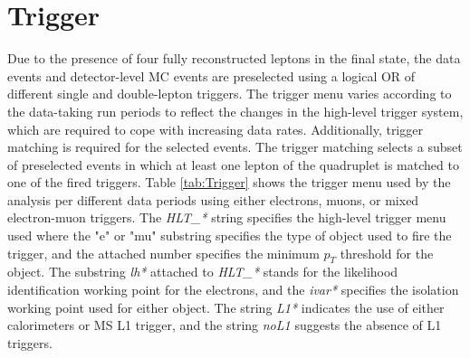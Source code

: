 \section{Trigger}
\label{sec:Trigger}

Due to the presence of four fully reconstructed leptons in the final state, the data events and detector-level MC events are preselected using a logical OR of different single and double-lepton triggers. The trigger menu varies according to the data-taking run periods to reflect the changes in the high-level trigger system, which are required to cope with increasing data rates. Additionally, trigger matching is required for the selected events. The trigger matching selects a subset of preselected events in which at least one lepton of the quadruplet is matched to one of the fired triggers. Table \ref{tab:Trigger} shows the trigger menu used by the analysis per different data periods using either electrons, muons, or mixed electron-muon triggers. The \textit{HLT\_*} string specifies the high-level trigger menu used where the "e" or "mu" substring specifies the type of object used to fire the trigger, and the attached number specifies the minimum $p_{T}$ threshold for the object. The substring \textit{lh*} attached to \textit{HLT\_*} stands for the likelihood identification working point for the electrons, and the \textit{ivar*} specifies the isolation working point used for either object. The string \textit{L1*} indicates the use of either calorimeters or MS L1 trigger, and the string \textit{noL1} suggests the absence of L1 triggers. 

